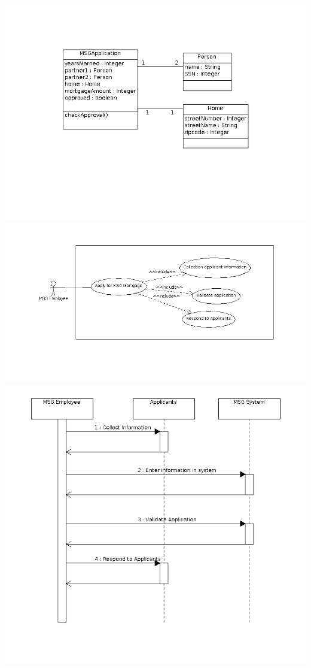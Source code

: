 \documentclass[12pt,letterpaper]{article}
\begin{document}
\begin{enumerate}
      \includegraphics[width=\textwidth]{hw1_part2.png}
      \includegraphics[width=\textwidth]{hw1_part2_2.png}
      \includegraphics[width=\textwidth]{hw1_part2_3.png}


\end{enumerate}
\end{document}
